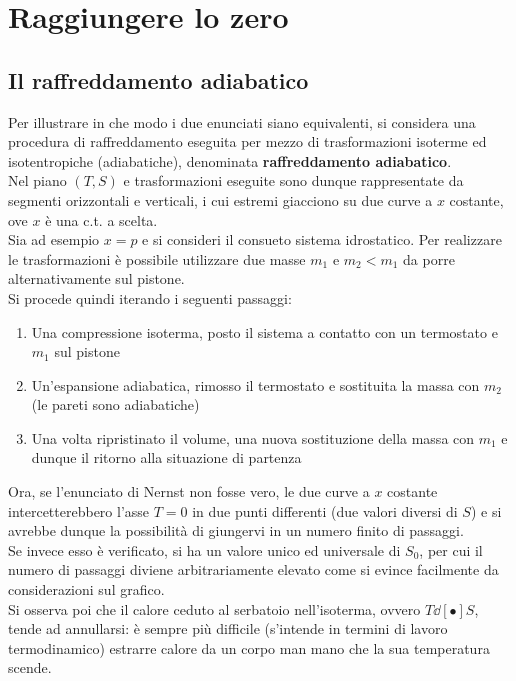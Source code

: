 \documentclass[10pt, oneside]{book}
\begin{document}
\section{Raggiungere lo zero}
\subsection{Il raffreddamento adiabatico}
Per illustrare in che modo i due enunciati siano equivalenti, si considera una procedura di raffreddamento eseguita per mezzo di trasformazioni isoterme ed isotentropiche (adiabatiche), denominata \textbf{raffreddamento adiabatico}.\\
Nel piano $(T,S)$ e trasformazioni eseguite sono dunque rappresentate da segmenti orizzontali e verticali, i cui estremi giacciono su due curve a $x$ costante, ove $x$ è una c.t. a scelta.\\
Sia ad esempio $x=p$ e si consideri il consueto sistema idrostatico. Per realizzare le trasformazioni è possibile utilizzare due masse $m_1$ e $m_2 < m_1$ da porre alternativamente sul pistone.\\
Si procede quindi iterando i seguenti passaggi:
\begin{enumerate}
\item Una compressione isoterma, posto il sistema a contatto con un termostato e $m_1$ sul pistone
\item Un'espansione adiabatica, rimosso il termostato e sostituita la massa con $m_2$ (le pareti sono adiabatiche)
\item Una volta ripristinato il volume, una nuova sostituzione della massa con $m_1$ e dunque il ritorno alla situazione di partenza
\end{enumerate}
Ora, se l'enunciato di Nernst non fosse vero, le due curve a $x$ costante intercetterebbero l'asse $T = 0$ in due punti differenti (due valori diversi di $S$) e si avrebbe dunque la possibilità di giungervi in un numero finito di passaggi.\\
Se invece esso è verificato, si ha un valore unico ed universale di $S_0$, per cui il numero di passaggi diviene arbitrariamente elevato come si evince facilmente da considerazioni sul grafico.\\
Si osserva poi che il calore ceduto al serbatoio nell'isoterma, ovvero $T\dd[•]{S}$, tende ad annullarsi: è sempre più difficile (s'intende in termini di lavoro termodinamico) estrarre calore da un corpo man mano che la sua temperatura scende.\\
\end{document}
